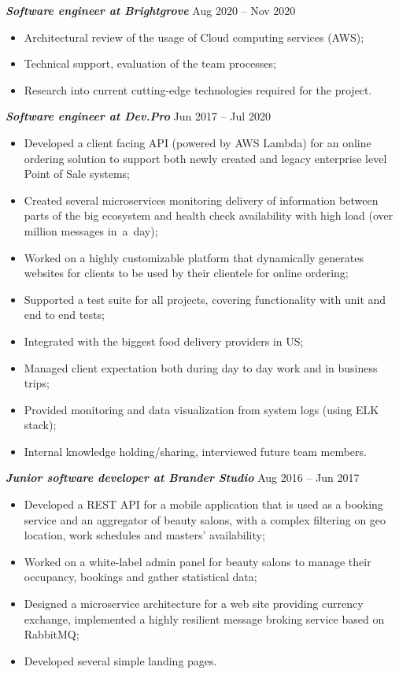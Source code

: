 \documentclass[margin, 10pt]{res} %
\begin{document}
\begin{resume}
{\sl \bf Software engineer at Brightgrove } \hfill Aug 2020 -- Nov 2020
\vspace{3px}
\begin{itemize}
 \item Architectural review of the usage of Cloud computing services (AWS);
 \item Technical support, evaluation of the team processes;
 \item Research into current cutting-edge technologies required for the project.
\end{itemize}

{\sl \bf Software engineer at Dev.Pro } \hfill Jun 2017 -- Jul 2020
\vspace{3px}
 \begin{itemize}
 \item Developed a client facing API (powered by AWS Lambda) for an online ordering solution to support both newly created and legacy enterprise level Point of Sale systems;
 \item Created several microservices monitoring delivery of information between parts of the big ecosystem and health check availability with high load (over million messages in~a~day);
 \item Worked on a highly customizable platform that dynamically generates websites for clients to be used by their clientele for online ordering;
 \item Supported a test suite for all projects, covering functionality with unit and end to end tests;
 \item Integrated with the biggest food delivery providers in US;
 \item Managed client expectation both during day to day work and in business trips;
 \item Provided monitoring and data visualization from system logs (using ELK stack);
 \item Internal knowledge holding/sharing, interviewed future team members.
\end{itemize}

{\sl \bf Junior software developer at Brander Studio} \hfill Aug 2016 -- Jun 2017
\vspace{3px}
\begin{itemize}
 \item Developed a REST API for a mobile application that is used as a booking service and an aggregator of beauty salons, with a complex filtering on geo location, work schedules and masters' availability;
 \item Worked on a white-label admin panel for beauty salons to manage their occupancy, bookings and gather statistical data;
 \item Designed a microservice architecture for a web site providing currency exchange, implemented a highly resilient message broking service based on RabbitMQ;
 \item Developed several simple landing pages.
\end{itemize}


\end{resume}
\end{document}
